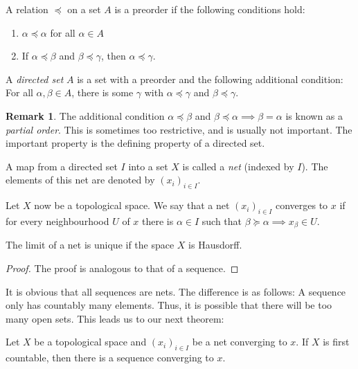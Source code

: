 \documentclass[twoside,symmetric, openany, 12pt]{./tuftebook}
\theoremstyle{definition}
\newtheorem{Remark}[Theorem]{Remark}
\theoremstyle{definition}
\theoremstyle{definition}
\newenvironment{parts}{\begin{enumerate}[label=(\alph*)]}{\end{enumerate}}
\begin{document}
\begin{Definition}[Preorder]
	A relation $\preceq$ on a set $A$ is a preorder if the following conditions hold:
	\begin{parts}
		\item $\alpha \preceq \alpha$ for all $\alpha\in A$
		\item If $\alpha\preceq \beta$ and $\beta\preceq\gamma$, then $\alpha\preceq\gamma$.
	\end{parts}
\end{Definition}
\begin{Definition}
	A \emph{directed set} $A$ is a set with a preorder and the following additional condition: For all $\alpha, \beta\in A$, there is some $\gamma$ with $\alpha \preceq \gamma$ and $\beta\preceq \gamma$. 
\end{Definition}
\begin{Remark}
The additional condition $\alpha\preceq \beta$ and $\beta\preceq \alpha\implies \beta=\alpha$ is known as a \emph{partial order}. This is sometimes too restrictive, and is usually not important. The important property is the defining property of a directed set.
\end{Remark}
\begin{Definition}
	A map from a directed set $I$ into a set $X$ is called a \emph{net} (indexed by $I$). The elements of this net are denoted by $(x_i)_{i\in I}$.
\end{Definition}
\begin{Definition}[Convergence]
	Let $X$ now be a topological space. We say that a net $(x_i)_{i\in I}$ converges to $x$ if for every neighbourhood $U$ of $x$ there is $\alpha\in I$ such that $\beta\succeq \alpha\implies x_\beta\in U$.
\end{Definition}
\begin{Theorem}
	The limit of a net is unique if the space $X$ is Hausdorff.
\end{Theorem}
\begin{proof}
The proof is analogous to that of a sequence.
\end{proof}

It is obvious that all sequences are nets. The difference is as follows: A sequence only has countably many elements. Thus, it is possible that there will be too many open sets. This leads us to our next theorem:

\begin{Theorem}
	Let $X$ be a topological space and $(x_i)_{i\in I}$ be a net converging to $x$. If $X$ is first countable, then there is a sequence converging to $x$.
\end{Theorem}
\end{document}
